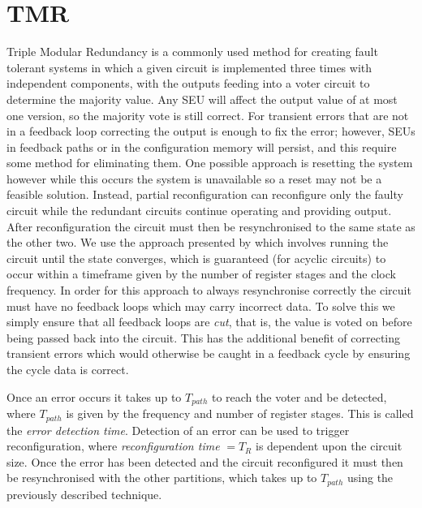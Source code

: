 \documentclass[12pt,final,oneside]{dwThesis} %
\begin{document}
\section{\acl{TMR}}
Triple Modular Redundancy is a commonly used method for creating fault tolerant systems in which a given circuit is implemented three times with independent components, with the outputs feeding into a voter circuit to determine the majority value. Any \ac{SEU} will affect the output value of at most one version, so the majority vote is still correct. For transient errors that are not in a feedback loop correcting the output is enough to fix the error; however, \acp{SEU} in feedback paths or in the configuration memory will persist, and this require some method for eliminating them. One possible approach is resetting the system however while this occurs the system is unavailable so a reset may not be a feasible solution. Instead, partial reconfiguration can reconfigure only the faulty circuit while the redundant circuits continue operating and providing output. After reconfiguration the circuit must then be resynchronised to the same state as the other two. We use the approach presented by \cite{DiesselChange} which involves running the circuit until the state converges, which is guaranteed (for acyclic circuits) to occur within a timeframe given by the number of register stages and the clock frequency. In order for this approach to always resynchronise correctly the circuit must have no feedback loops which may carry incorrect data. To solve this we simply ensure that all feedback loops are \emph{cut}, that is, the value is voted on before being passed back into the circuit. This has the additional benefit of correcting transient errors which would otherwise be caught in a feedback cycle by ensuring the cycle data is correct.

Once an error occurs it takes up to $T_{path}$ to reach the voter and be detected, where $T_{path}$ is given by the frequency and number of register stages. This is called the \emph{error detection time}. Detection of an error can be used to trigger reconfiguration, where \emph{reconfiguration time} $= T_R$ is dependent upon the circuit size. Once the error has been detected and the circuit reconfigured it must then be resynchronised with the other partitions, which takes up to $T_{path}$ using the previously described technique.
\end{document}
